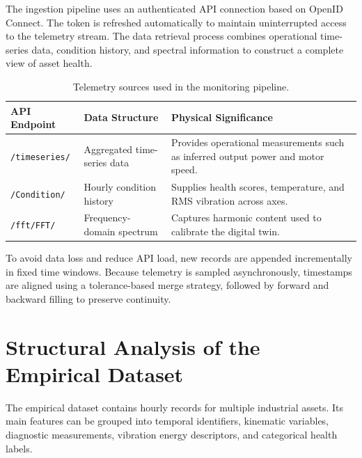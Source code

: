 \documentclass[journal,10pt,a4paper]{IEEEtran}
\begin{document}
The ingestion pipeline uses an authenticated API connection based on OpenID Connect. The token is refreshed automatically to maintain uninterrupted access to the telemetry stream. The data retrieval process combines operational time-series data, condition history, and spectral information to construct a complete view of asset health.

\begin{table}[H]
\centering
\caption{Telemetry sources used in the monitoring pipeline.}
\label{tab:telemetry-sources}
\begin{tabularx}{\columnwidth}{>{\hsize}Y >{\hsize}Y >{\hsize}Y}
\toprule
\textbf{API Endpoint} & \textbf{Data Structure} & \textbf{Physical Significance} \\
\midrule
\texttt{/timeseries/} & Aggregated time-series data & Provides operational measurements such as inferred output power and motor speed. \\
\addlinespace
\texttt{/Condition/} & Hourly condition history & Supplies health scores, temperature, and RMS vibration across axes. \\
\addlinespace
\texttt{/fft/FFT/} & Frequency-domain spectrum & Captures harmonic content used to calibrate the digital twin. \\
\bottomrule
\end{tabularx}
\end{table}

To avoid data loss and reduce API load, new records are appended incrementally in fixed time windows. Because telemetry is sampled asynchronously, timestamps are aligned using a tolerance-based merge strategy, followed by forward and backward filling to preserve continuity.

\section{Structural Analysis of the Empirical Dataset}
The empirical dataset contains hourly records for multiple industrial assets. Its main features can be grouped into temporal identifiers, kinematic variables, diagnostic measurements, vibration energy descriptors, and categorical health labels.
\end{document}
